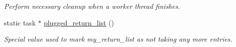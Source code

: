 \begin{DoxyCompactItemize}
\begin{DoxyCompactList}\small\item\em Perform necessary cleanup when a worker thread finishes. \end{DoxyCompactList}\item 
\hypertarget{classtbb_1_1internal_1_1generic__scheduler_abb580929e3e34d6da1728e6fee8b6979}{}static task $\ast$ \hyperlink{classtbb_1_1internal_1_1generic__scheduler_abb580929e3e34d6da1728e6fee8b6979}{plugged\+\_\+return\+\_\+list} ()\label{classtbb_1_1internal_1_1generic__scheduler_abb580929e3e34d6da1728e6fee8b6979}

\begin{DoxyCompactList}\small\item\em Special value used to mark my\+\_\+return\+\_\+list as not taking any more entries. \end{DoxyCompactList}\end{DoxyCompactItemize}
